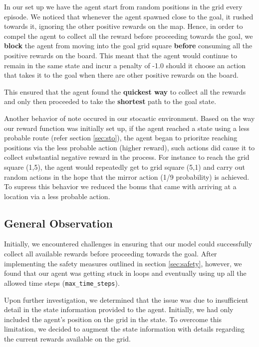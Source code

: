\documentclass{article} %
\begin{document}
In our set up we have the agent start from random positions in the grid every episode. We
noticed that whenever the agent spawned close to the goal, it rushed towards it, ignoring the
other positive rewards on the map. Hence, in order to compel the agent to collect all the reward
before proceeding towards the goal, we \textbf{block} the agent from moving into the goal
grid square \textbf{before} consuming all the positive rewards on the board. This meant that the
agent would continue to remain in the same state and incur a penalty of -1.0 should it choose an
action that takes it to the goal when there are other positive rewards on the board.

This ensured that the agent found the \textbf{quickest way} to collect all the rewards and
only then proceeded to take the \textbf{shortest} path to the goal state.

Another behavior of note occured in our stocastic environment. Based on the way our reward
function was initially set up, if the agent reached a state using a less probable route (refer
section \ref{sec:sto}), the agent began to prioritze reaching positions via the less probable
action (higher reward), such actions did cause it to collect substantial negative reward
in the process. For instance to reach the grid square (1,5), the agent would repeatedly get to
grid square (5,1) and carry out random actions in the hope that the mirror action (1/9
probability) is achieved. To supress this behavior we reduced the bonus that came with
arriving at a location via a less probable action.


\subsection{General Observation}
Initially, we encountered challenges in ensuring that our model could successfully collect
all available rewards before proceeding towards the goal. After implementing the safety
measures outlined in section \ref{sec:safety}, however, we found that our agent was getting
stuck in loops and eventually using up all the allowed time steps (\verb|max_time_steps|).

Upon further investigation, we determined that the issue was due to insufficient detail in
the state information provided to the agent. Initially, we had only included the agent's
position on the grid in the state. To overcome this limitation, we decided to augment the
state information with details regarding the current rewards available on the grid.
\end{document}
